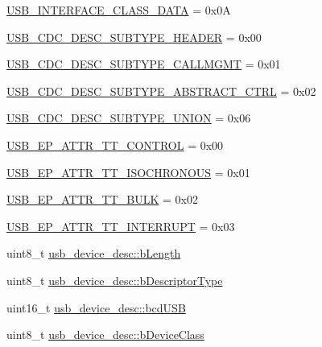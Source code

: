 \begin{DoxyCompactItemize}
\hyperlink{group___p_i_o_s___u_s_b___d_e_f_s_gacf58991b679e8a7c83d8b7fd4de2b0c3}{\-U\-S\-B\-\_\-\-I\-N\-T\-E\-R\-F\-A\-C\-E\-\_\-\-C\-L\-A\-S\-S\-\_\-\-D\-A\-T\-A} = 0x0\-A
\item 
\hyperlink{group___p_i_o_s___u_s_b___d_e_f_s_gac9115f2ac7d1d17980e46b7ce7a50ea0}{\-U\-S\-B\-\_\-\-C\-D\-C\-\_\-\-D\-E\-S\-C\-\_\-\-S\-U\-B\-T\-Y\-P\-E\-\_\-\-H\-E\-A\-D\-E\-R} = 0x00
\item 
\hyperlink{group___p_i_o_s___u_s_b___d_e_f_s_ga8d83d4113ad6da600bb1f5c9e59f6701}{\-U\-S\-B\-\_\-\-C\-D\-C\-\_\-\-D\-E\-S\-C\-\_\-\-S\-U\-B\-T\-Y\-P\-E\-\_\-\-C\-A\-L\-L\-M\-G\-M\-T} = 0x01
\item 
\hyperlink{group___p_i_o_s___u_s_b___d_e_f_s_ga043b00a6c78699ea40980c4e6b6953fe}{\-U\-S\-B\-\_\-\-C\-D\-C\-\_\-\-D\-E\-S\-C\-\_\-\-S\-U\-B\-T\-Y\-P\-E\-\_\-\-A\-B\-S\-T\-R\-A\-C\-T\-\_\-\-C\-T\-R\-L} = 0x02
\item 
\hyperlink{group___p_i_o_s___u_s_b___d_e_f_s_ga1e82533e12e430b159c6f3991c9f9abc}{\-U\-S\-B\-\_\-\-C\-D\-C\-\_\-\-D\-E\-S\-C\-\_\-\-S\-U\-B\-T\-Y\-P\-E\-\_\-\-U\-N\-I\-O\-N} = 0x06
\item 
\hyperlink{group___p_i_o_s___u_s_b___d_e_f_s_ga070156f09d8bdc57ba3bda2bf9f3d094}{\-U\-S\-B\-\_\-\-E\-P\-\_\-\-A\-T\-T\-R\-\_\-\-T\-T\-\_\-\-C\-O\-N\-T\-R\-O\-L} = 0x00
\item 
\hyperlink{group___p_i_o_s___u_s_b___d_e_f_s_ga3c73315ff55c81c383cf543def2ea98f}{\-U\-S\-B\-\_\-\-E\-P\-\_\-\-A\-T\-T\-R\-\_\-\-T\-T\-\_\-\-I\-S\-O\-C\-H\-R\-O\-N\-O\-U\-S} = 0x01
\item 
\hyperlink{group___p_i_o_s___u_s_b___d_e_f_s_gafaccb056cfc2641b997193afe0cad5b0}{\-U\-S\-B\-\_\-\-E\-P\-\_\-\-A\-T\-T\-R\-\_\-\-T\-T\-\_\-\-B\-U\-L\-K} = 0x02
\item 
\hyperlink{group___p_i_o_s___u_s_b___d_e_f_s_ga4708a7eac40380fbc1d641c9d631a06e}{\-U\-S\-B\-\_\-\-E\-P\-\_\-\-A\-T\-T\-R\-\_\-\-T\-T\-\_\-\-I\-N\-T\-E\-R\-R\-U\-P\-T} = 0x03
\item 
uint8\-\_\-t \hyperlink{group___p_i_o_s___u_s_b___d_e_f_s_gae982ead8e11c6f9bd465132001f83c11}{usb\-\_\-device\-\_\-desc\-::b\-Length}
\item 
uint8\-\_\-t \hyperlink{group___p_i_o_s___u_s_b___d_e_f_s_gaa704e180aaabca3aa213472f102bd91e}{usb\-\_\-device\-\_\-desc\-::b\-Descriptor\-Type}
\item 
uint16\-\_\-t \hyperlink{group___p_i_o_s___u_s_b___d_e_f_s_ga9f1c1b7e10dd6118532befba9204375c}{usb\-\_\-device\-\_\-desc\-::bcd\-U\-S\-B}
\item 
uint8\-\_\-t \hyperlink{group___p_i_o_s___u_s_b___d_e_f_s_ga04601bd230a37ec17da04c14036b4094}{usb\-\_\-device\-\_\-desc\-::b\-Device\-Class}

\end{DoxyCompactItemize}
